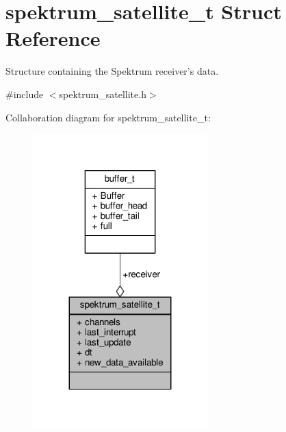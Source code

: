 \hypertarget{structspektrum__satellite__t}{\section{spektrum\+\_\+satellite\+\_\+t Struct Reference}
\label{structspektrum__satellite__t}
}


Structure containing the Spektrum receiver's data.  




{\ttfamily \#include $<$spektrum\+\_\+satellite.\+h$>$}



Collaboration diagram for spektrum\+\_\+satellite\+\_\+t\+:
\nopagebreak
\begin{figure}[H]
\begin{center}
\leavevmode
\includegraphics[width=191pt]{structspektrum__satellite__t__coll__graph}
\end{center}
\end{figure}
